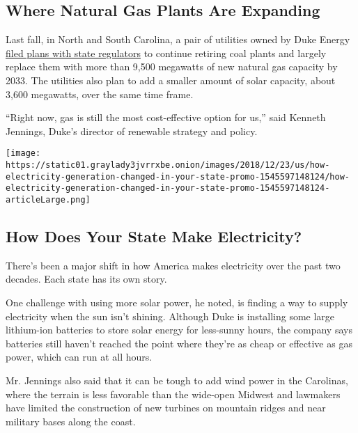 \hypertarget{where-natural-gas-plants-are-expanding}{%
\subsection{Where Natural Gas Plants Are
Expanding}\label{where-natural-gas-plants-are-expanding}}

Last fall, in North and South Carolina, a pair of utilities owned by
Duke Energy
\href{https://www.utilitydive.com/news/duke-15-year-plans-lean-heavy-on-gas-to-replace-coal/531924/}{filed
plans with state regulators} to continue retiring coal plants and
largely replace them with more than 9,500 megawatts of new natural gas
capacity by 2033. The utilities also plan to add a smaller amount of
solar capacity, about 3,600 megawatts, over the same time frame.

``Right now, gas is still the most cost-effective option for us,'' said
Kenneth Jennings, Duke's director of renewable strategy and policy.

\href{https://www.nytimes3xbfgragh.onion/interactive/2018/12/24/climate/how-electricity-generation-changed-in-your-state.html}{}

\texttt{[image: https://static01.graylady3jvrrxbe.onion/images/2018/12/23/us/how-electricity-generation-changed-in-your-state-promo-1545597148124/how-electricity-generation-changed-in-your-state-promo-1545597148124-articleLarge.png]}

\hypertarget{how-does-your-state-make-electricity}{%
\subsection{How Does Your State Make
Electricity?}\label{how-does-your-state-make-electricity}}

There's been a major shift in how America makes electricity over the
past two decades. Each state has its own story.

One challenge with using more solar power, he noted, is finding a way to
supply electricity when the sun isn't shining. Although Duke is
installing some large lithium-ion batteries to store solar energy for
less-sunny hours, the company says batteries still haven't reached the
point where they're as cheap or effective as gas power, which can run at
all hours.

Mr. Jennings also said that it can be tough to add wind power in the
Carolinas, where the terrain is less favorable than the wide-open
Midwest and lawmakers have limited the construction of new turbines on
mountain ridges and near military bases along the coast.

